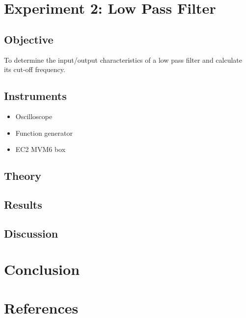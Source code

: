 
\section{Experiment 2: Low Pass Filter}

\subsection{Objective}
To determine the input/output characteristics of a low pass filter and calculate its cut-off frequency.

\subsection{Instruments}
\begin{itemize}
\item Oscilloscope
\item Function generator
\item EC2 MVM6 box
\end{itemize}

\subsection{Theory}

\subsection{Results}

\subsection{Discussion}

\section{Conclusion}

\section{References}
